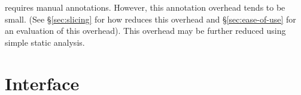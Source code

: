 
 \tern requires manual annotations.  However, this
annotation overhead tends to be small.  (See \S\ref{sec:slicing} for how
\tern reduces this overhead and \S\ref{sec:ease-of-use} for an evaluation
of this overhead).  This overhead may be further reduced using simple static analysis.



\section{Interface}  \label{sec:annotations}

